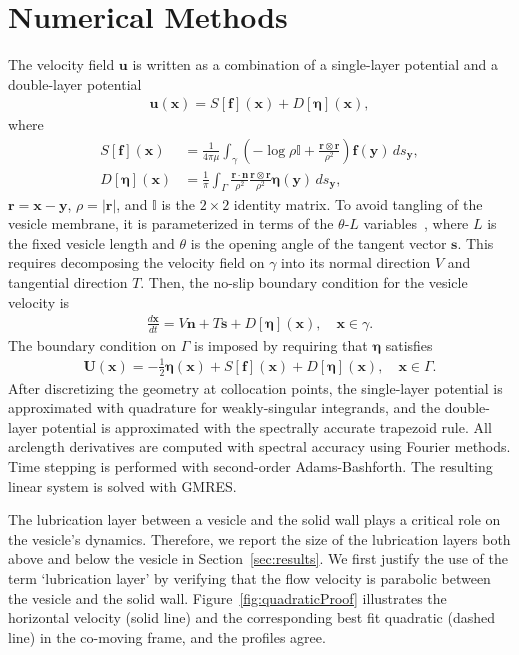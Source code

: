 \documentclass[twoside,twocolumn,9pt]{article}
\newcommand{\ff}{\mathbf{f}}
\newcommand{\eeta}{\boldsymbol{\eta}}
\newcommand{\nn}{\mathbf{n}}
\newcommand{\rr}{\mathbf{r}}
\renewcommand{\ss}{\mathbf{s}}
\newcommand{\uu}{\mathbf{u}}
\newcommand{\UU}{\mathbf{U}}
\newcommand{\xx}{\mathbf{x}}
\newcommand{\yy}{\mathbf{y}}
\begin{document}
\section{\label{sec:NumericalMethods}Numerical Methods}
The velocity field $\uu$ is written as a combination of a single-layer potential and a double-layer potential
\begin{align}
    \label{eqn:LPrep}
    \uu(\xx) = S[\ff](\xx) + D[\eeta](\xx),
\end{align}
where
\begin{align}
    S[\ff](\xx) &= \frac{1}{4\pi\mu} \int_{\gamma} \left(-\log \rho \mathds{I} + \frac{\rr \otimes \rr}{\rho^2} \right)
    \ff(\yy) \, ds_\yy, \\
%
    D[\eeta](\xx) &= \frac{1}{\pi} \int_{\Gamma} \frac{\rr \cdot \nn}{\rho^2}
        \frac{\rr \otimes \rr}{\rho^2} \eeta(\yy) \, ds_\yy,
\end{align}
$\rr = \xx - \yy$, $\rho = |\rr|$, and $\mathds{I}$ is the $2 \times 2$ identity matrix. To avoid tangling of the vesicle membrane, it is parameterized in terms of the $\theta$-$L$ variables~\cite{hou-low-she1994}, where $L$ is the fixed vesicle length and $\theta$ is the opening angle of the tangent vector $\ss$. This requires decomposing the velocity field on $\gamma$ into its normal direction $V$ and tangential direction $T$. Then, the no-slip boundary condition for the vesicle velocity is
\begin{align}
    \frac{d\xx}{dt} = V \nn + T \ss + D[\eeta](\xx), \quad \xx \in \gamma.
\end{align}
The boundary condition on $\Gamma$ is imposed by requiring that $\eeta$ satisfies
\begin{align}
    \UU(\xx) = -\frac{1}{2}\eeta(\xx) + S[\ff](\xx) + D[\eeta](\xx), \quad \xx \in \Gamma.
    \label{eqn:DLP_BIE}
\end{align}
After discretizing the geometry at collocation points, the single-layer potential is approximated with quadrature for weakly-singular integrands, and the double-layer potential is approximated with the spectrally accurate trapezoid rule. All arclength derivatives are computed with spectral accuracy using Fourier methods. Time stepping is performed with second-order Adams-Bashforth. The resulting linear system is solved with GMRES.

The lubrication layer between a vesicle and the solid wall plays a critical role on the vesicle's dynamics. Therefore, we report the size of the lubrication layers both above and below the vesicle in Section~\ref{sec:results}. We first justify the use of the term `lubrication layer' by verifying that the flow velocity is parabolic between the vesicle and the solid wall. Figure~\ref{fig:quadraticProof} illustrates the horizontal velocity (solid line) and the corresponding best fit quadratic (dashed line) in the co-moving frame, and the profiles agree.
\end{document}
